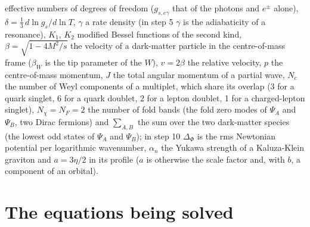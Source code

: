 \documentclass[
  10pt,
]{article}
\begin{document}
effective numbers of degrees of freedom (\(g_{s,e\gamma}\) that of the
photons and \(e^\pm\) alone), \(\delta = \frac13\,d\ln g_s/d\ln T\),
\(\gamma\) a rate density (in step 5 \(\gamma\) is the adiabaticity of a
resonance), \(K_1\), \(K_2\) modified Bessel functions of the second
kind, \(\beta = \sqrt{1 - 4M^2/s}\) the velocity of a dark-matter
particle in the centre-of-mass frame (\(\beta_W\) is the tip parameter
of the \(W\)), \(v = 2\beta\) the relative velocity, \(p\) the
centre-of-mass momentum, \(J\) the total angular momentum of a partial
wave, \(N_c\) the number of Weyl components of a multiplet, which share
its overlap (3 for a quark singlet, 6 for a quark doublet, 2 for a
lepton doublet, 1 for a charged-lepton singlet), \(N_\chi = N_F = 2\)
the number of fold bands (the fold zero modes of \(\Psi_A\) and
\(\Psi_B\), two Dirac fermions) and \(\sum_{A,B}\) the sum over the two
dark-matter species (the lowest odd states of \(\Psi_A\) and
\(\Psi_B\)); in step 10 \(\Delta_\Phi\) is the rms Newtonian potential
per logarithmic wavenumber, \(\alpha_n\) the Yukawa strength of a
Kaluza-Klein graviton and \(a = 3\eta/2\) in its profile (\(a\) is
otherwise the scale factor and, with \(b\), a component of an orbital).

\hypertarget{the-equations-being-solved}{%
\section{The equations being solved}\label{the-equations-being-solved}}
\end{document}
